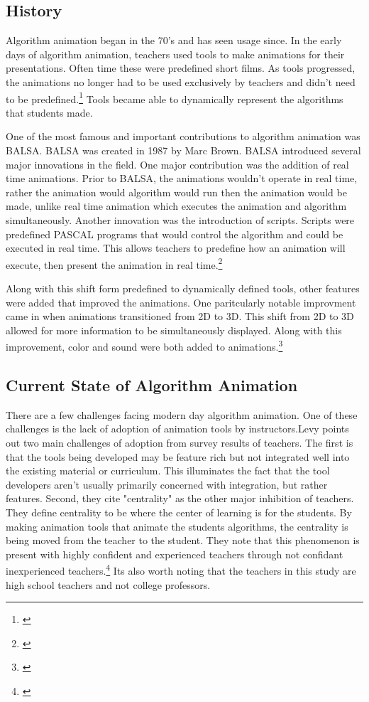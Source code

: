 \documentclass[12pt,twoside]{reedthesis}
\begin{document}
\subsection{History}
Algorithm animation began in the 70's and has seen usage since. In the early days of algorithm animation, teachers used tools to make animations for their presentations. Often time these were predefined short films. As tools progressed, the animations no longer had to be used exclusively by teachers and didn't need to be predefined.\footnote{\cite{hundhausen_meta-study_2002}} Tools became able to dynamically represent the algorithms that students made. 

One of the most famous and important contributions to algorithm animation was BALSA. BALSA was created in 1987 by Marc Brown. BALSA introduced several major innovations in the field. One major contribution was the addition of real time animations. Prior to BALSA, the animations wouldn't operate in real time, rather the animation would algorithm would run then the animation would be made, unlike real time animation which executes the animation and algorithm simultaneously. Another innovation was the introduction of scripts. Scripts were predefined PASCAL programs that would control the algorithm and could be executed in real time. This allows teachers to predefine how an animation will execute, then present the animation in real time.\footnote{\cite{brown_algorithm_1987}}

Along with this shift form predefined to dynamically defined tools, other features were added that improved the animations. One paritcularly notable improvment came in when animations transitioned from 2D to 3D. This shift from 2D to 3D allowed for more information to be simultaneously displayed. Along with this improvement, color and sound were both added to animations.\footnote{\cite{najork_library_1994}}

\subsection{Current State of Algorithm Animation}
There are a few challenges facing modern day algorithm animation. One of these challenges is the lack of adoption of animation tools by instructors.Levy points out two main challenges of adoption from survey results of teachers. The first is that the tools being developed may be feature rich but not integrated well into the existing material or curriculum. This illuminates the fact that the tool developers aren't usually primarily concerned with integration, but rather features. Second, they cite "centrality" as the other major inhibition of teachers. They define centrality to be 	where the center of learning is for the students. By making animation tools that animate the students algorithms, the centrality is being moved from the teacher to the student. They note that this phenomenon is present with highly confident and experienced teachers through not confidant inexperienced teachers.\footnote{\cite{levy_we_2007}}  Its also worth noting that the teachers in this study are high school teachers and not college professors. 
\end{document}
